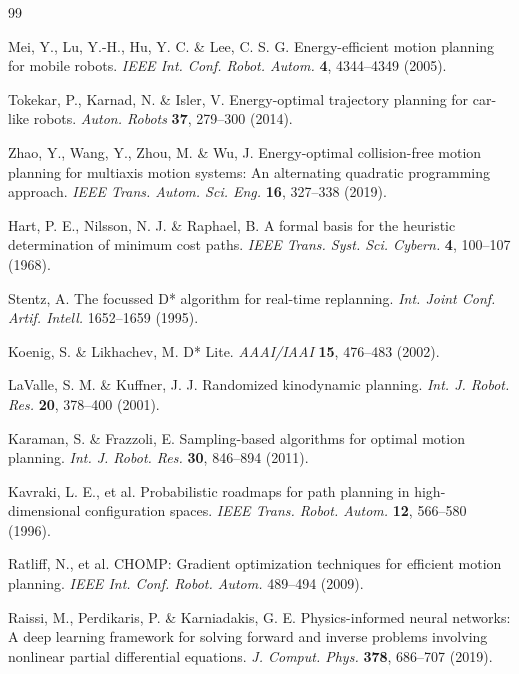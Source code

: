\documentclass[pdflatex,sn-nature]{sn-jnl}%
\begin{document}
\begin{thebibliography}{99}

Mei, Y., Lu, Y.-H., Hu, Y. C. \& Lee, C. S. G. Energy-efficient motion planning for mobile robots. \textit{IEEE Int. Conf. Robot. Autom.} \textbf{4}, 4344--4349 (2005).

Tokekar, P., Karnad, N. \& Isler, V. Energy-optimal trajectory planning for car-like robots. \textit{Auton. Robots} \textbf{37}, 279--300 (2014).

Zhao, Y., Wang, Y., Zhou, M. \& Wu, J. Energy-optimal collision-free motion planning for multiaxis motion systems: An alternating quadratic programming approach. \textit{IEEE Trans. Autom. Sci. Eng.} \textbf{16}, 327--338 (2019).

Hart, P. E., Nilsson, N. J. \& Raphael, B. A formal basis for the heuristic determination of minimum cost paths. \textit{IEEE Trans. Syst. Sci. Cybern.} \textbf{4}, 100--107 (1968).

Stentz, A. The focussed D* algorithm for real-time replanning. \textit{Int. Joint Conf. Artif. Intell.} 1652--1659 (1995).

Koenig, S. \& Likhachev, M. D* Lite. \textit{AAAI/IAAI} \textbf{15}, 476--483 (2002).

LaValle, S. M. \& Kuffner, J. J. Randomized kinodynamic planning. \textit{Int. J. Robot. Res.} \textbf{20}, 378--400 (2001).

Karaman, S. \& Frazzoli, E. Sampling-based algorithms for optimal motion planning. \textit{Int. J. Robot. Res.} \textbf{30}, 846--894 (2011).

Kavraki, L. E., et al. Probabilistic roadmaps for path planning in high-dimensional configuration spaces. \textit{IEEE Trans. Robot. Autom.} \textbf{12}, 566--580 (1996).

Ratliff, N., et al. CHOMP: Gradient optimization techniques for efficient motion planning. \textit{IEEE Int. Conf. Robot. Autom.} 489--494 (2009).

Raissi, M., Perdikaris, P. \& Karniadakis, G. E. Physics-informed neural networks: A deep learning framework for solving forward and inverse problems involving nonlinear partial differential equations. \textit{J. Comput. Phys.} \textbf{378}, 686--707 (2019).


\end{thebibliography}
\end{document}
